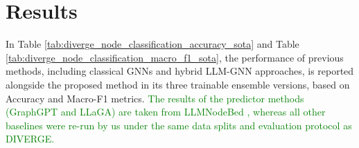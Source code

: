 \documentclass[a4paper,fleqn]{cas-sc}
\newcommand{\revthree}[1]{\textcolor{green}{#1}} %
\begin{document}
\section{Results}\label{sec:Results}

In Table \ref{tab:diverge_node_classification_accuracy_sota} and Table \ref{tab:diverge_node_classification_macro_f1_sota}, the performance of previous methods, including classical GNNs and hybrid LLM-GNN approaches, is reported alongside the proposed method in its three trainable ensemble versions, based on Accuracy and Macro-F1 metrics. \revthree{The results of the predictor methods (GraphGPT and LLaGA) are taken from LLMNodeBed \citep{Wu2025LLMNode}, whereas all other baselines were re-run by us under the same data splits and evaluation protocol as DIVERGE.}
\end{document}
